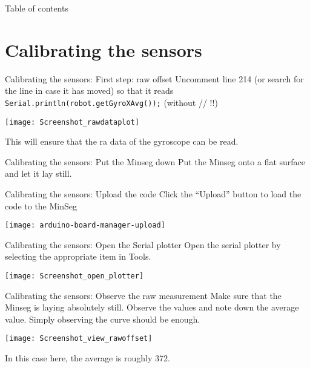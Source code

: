 \begin{frame}{Table of contents}
	\tableofcontents
\end{frame}

\section{Calibrating the sensors}
\begin{frame}{Calibrating the sensors: First step: raw offset}
	Uncomment line 214 (or search for the line in case it has moved) so that it reads \texttt{Serial.println(robot.getGyroXAvg());} (without // !!)
	\begin{center}
		\texttt{[image: Screenshot\_rawdataplot]}
	\end{center}
	This will ensure that the ra data of the gyroscope can be read.
\end{frame}

\begin{frame}{Calibrating the sensors: Put the Minseg down}
	Put the Minseg onto a flat surface and let it lay still.
\end{frame}

\begin{frame}{Calibrating the sensors: Upload the code}
	Click the ``Upload'' button to load the code to the MinSeg
	\begin{center}
		\texttt{[image: arduino-board-manager-upload]}
	\end{center}
\end{frame}

\begin{frame}{Calibrating the sensors: Open the Serial plotter}
	Open the serial plotter by selecting the appropriate item in Tools.
	\begin{center}
		\texttt{[image: Screenshot\_open\_plotter]}
	\end{center}
\end{frame}

\begin{frame}{Calibrating the sensors: Observe the raw measurement}
	Make sure that the Minseg is laying absolutely still. Observe the values and note down the average value. Simply observing the curve should be enough.
	\begin{center}
		\texttt{[image: Screenshot\_view\_rawoffset]}
	\end{center}
	In this case here, the average is roughly 372.
\end{frame}

